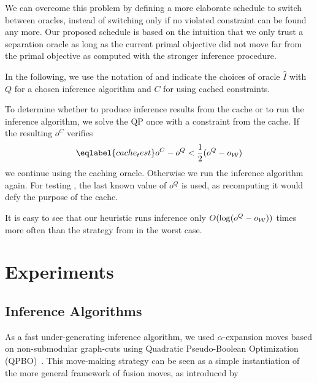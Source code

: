 We can overcome this problem by defining a more elaborate schedule to switch
between oracles, instead of switching only if no violated constraint can be
found any more. Our proposed schedule is based on the intuition that we only
trust a separation oracle as long as the current primal objective did not move
far from the primal objective as computed with the stronger inference
procedure.


In the following, we use the notation of  and indicate
the choices of oracle $\hat{I}$ with $Q$ for a chosen inference algorithm and $C$ for
using cached constraints.

To determine whether to produce inference results from the cache or to run the inference algorithm,
we solve the QP once with a constraint from the cache. If the resulting $o^C$ verifies
\begin{equation}\eqlabel{cache_test}
    o^C - o^Q < \frac{1}{2} (o^Q - o_{\W})
\end{equation}
we continue using the caching oracle. Otherwise we run the inference algorithm again.
For testing , the last known value of $o^Q$ is used, as recomputing it would defy
the purpose of the cache.

It is easy to see that our heuristic runs inference only $O(\log(o^Q -
o_{\mathcal{W}}))$ times more often than the strategy from \citet{joachims2009cutting} in the
worst case.


\section{Experiments}

\subsection{Inference Algorithms}

As a fast under-generating inference algorithm, we used $\alpha$-expansion
moves based on non-submodular graph-cuts using Quadratic Pseudo-Boolean
Optimization (QPBO)~\citep{rother2007optimizing}.  This move-making strategy
can be seen as a simple instantiation of the more general framework of fusion
moves, as introduced by \citet{lempitsky2010fusion}

